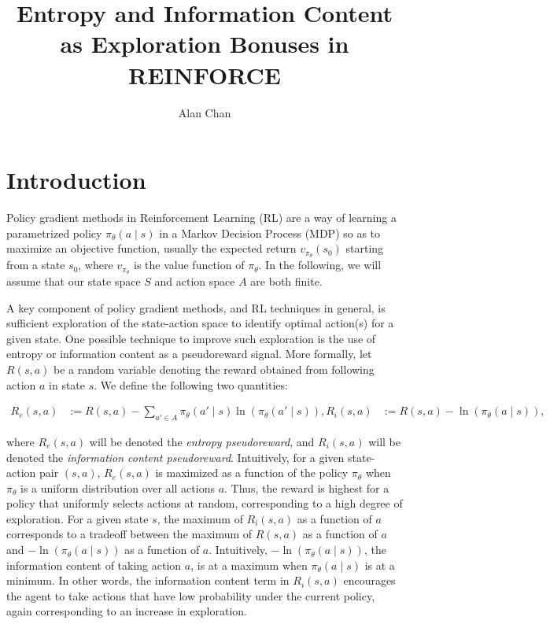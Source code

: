 \documentclass{article}
\title{Entropy and Information Content as Exploration Bonuses in REINFORCE}
\author{Alan Chan}
\date{}
\begin{document}
  \maketitle

  \section{Introduction}
  Policy gradient methods \citep[Chapter~13]{sutton2018reinforcement} in Reinforcement Learning (RL) are a way of learning a parametrized policy $\pi_\theta(a \mid s)$ in a Markov Decision Process (MDP) so as to maximize an objective function, usually the expected return $v_{\pi_\theta}(s_0)$ starting from a state $s_0$, where $v_{\pi_\theta}$ is the value function of $\pi_\theta$. In the following, we will assume that our state space $S$ and action space $A$ are both finite.

  A key component of policy gradient methods, and RL techniques in general, is sufficient exploration of the state-action space to identify optimal action(s) for a given state. One possible technique to improve such exploration is the use of entropy or information content as a pseudoreward signal. More formally, let $R(s, a)$ be a random variable denoting the reward obtained from following action $a$ in state $s$. We define the following two quantities:

  \begin{align*}
    R_e(s, a) &:= R(s, a) - \sum_{a' \in A} \pi_\theta(a' \mid s) \ln\left(\pi_\theta(a' \mid s)\right),
    R_i(s, a) &:= R(s, a) - \ln\left(\pi_\theta(a \mid s)\right),
  \end{align*}

  where $R_e(s, a)$ will be denoted the \textit{entropy pseudoreward}, and $R_i(s, a)$ will be denoted the \textit{information content pseudoreward}. Intuitively, for a given state-action pair $(s, a)$, $R_e(s, a)$ is maximized as a function of the policy $\pi_\theta$ when $\pi_\theta$ is a uniform distribution over all actions $a$. Thus, the reward is highest for a policy that uniformly selects actions at random, corresponding to a high degree of exploration. For a given state $s$, the maximum of $R_i(s, a)$ as a function of $a$ corresponds to a tradeoff between the maximum of $R(s, a)$ as a function of $a$ and $- \ln\left(\pi_\theta(a \mid s)\right)$ as a function of $a$. Intuitively, $- \ln\left(\pi_\theta(a \mid s)\right)$, the information content of taking action $a$, is at a maximum when $\pi_\theta(a \mid s)$ is at a minimum. In other words, the information content term in $R_i(s, a)$ encourages the agent to take actions that have low probability under the current policy, again corresponding to an increase in exploration.
\end{document}

